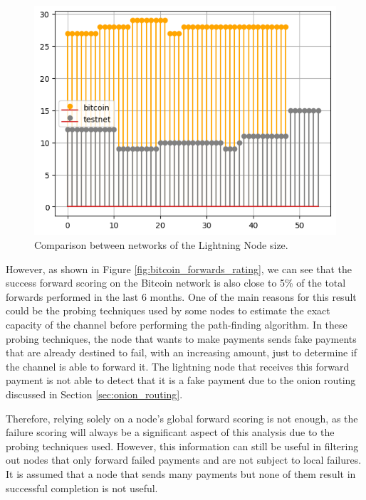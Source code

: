 \begin{figure}[H]
    \begin{center}
      \includegraphics[scale=0.7]{imgs/bitcoin_vs_testnet_channels_size.png}
    \end{center}
    \caption{Comparison between networks of the Lightning Node size.}
    \label{fig:bitcoin_vs_testnet_channels_size}
\end{figure}

However, as shown in Figure \ref{fig:bitcoin_forwards_rating}, we can see that the success
forward scoring on the Bitcoin network is also close to 5\% of the total forwards performed 
in the last 6 months. One of the main reasons for this result could be the probing techniques 
used by some nodes to estimate the exact capacity of the channel before performing the path-finding
algorithm. In these probing techniques, the node that wants to make payments sends fake payments
that are already destined to fail, with an increasing amount, just to determine if the channel 
is able to forward it. The lightning node that receives this forward payment is not able to 
detect that it is a fake payment due to the onion routing discussed in Section \ref{sec:onion_routing}.

Therefore, relying solely on a node's global forward scoring is not enough, as the failure
scoring will always be a significant aspect of this analysis due to the probing techniques
used. However, this information can still be useful in filtering out nodes that only
forward failed payments and are not subject to local failures. It is assumed that a node
that sends many payments but none of them result in successful completion is not useful.

